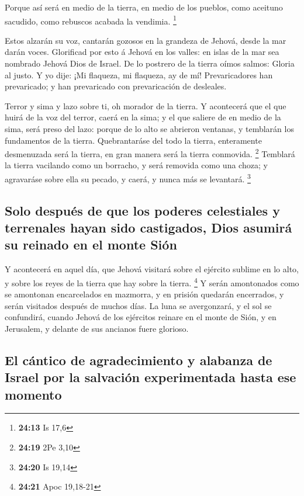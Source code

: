  Porque así será en medio de la tierra, en medio de los
pueblos, como aceituno sacudido, como rebuscos acabada la vendimia.
\footnote{\textbf{24:13} Is 17,6}

 Estos alzarán su voz, cantarán gozosos en la grandeza de
Jehová, desde la mar darán voces.  Glorificad por esto á
Jehová en los valles: en islas de la mar sea nombrado Jehová Dios de
Israel.  De lo postrero de la tierra oímos salmos: Gloria
al justo. Y yo dije: ¡Mi flaqueza, mi flaqueza, ay de mí! Prevaricadores
han prevaricado; y han prevaricado con prevaricación de desleales.

 Terror y sima y lazo sobre ti, oh morador de la tierra.
 Y acontecerá que el que huirá de la voz del terror,
caerá en la sima; y el que saliere de en medio de la sima, será preso
del lazo: porque de lo alto se abrieron ventanas, y temblarán los
fundamentos de la tierra.  Quebrantaráse del todo la
tierra, enteramente desmenuzada será la tierra, en gran manera será la
tierra conmovida. \footnote{\textbf{24:19} 2Pe 3,10} 
Temblará la tierra vacilando como un borracho, y será removida como una
choza; y agravaráse sobre ella su pecado, y caerá, y nunca más se
levantará. \footnote{\textbf{24:20} Is 19,14}

\hypertarget{solo-despuuxe9s-de-que-los-poderes-celestiales-y-terrenales-hayan-sido-castigados-dios-asumiruxe1-su-reinado-en-el-monte-siuxf3n}{%
\subsection{Solo después de que los poderes celestiales y terrenales
hayan sido castigados, Dios asumirá su reinado en el monte
Sión}\label{solo-despuuxe9s-de-que-los-poderes-celestiales-y-terrenales-hayan-sido-castigados-dios-asumiruxe1-su-reinado-en-el-monte-siuxf3n}}

 Y acontecerá en aquel día, que Jehová visitará sobre el
ejército sublime en lo alto, y sobre los reyes de la tierra que hay
sobre la tierra. \footnote{\textbf{24:21} Apoc 19,18-21} 
Y serán amontonados como se amontonan encarcelados en mazmorra, y en
prisión quedarán encerrados, y serán visitados después de muchos días.
 La luna se avergonzará, y el sol se confundirá, cuando
Jehová de los ejércitos reinare en el monte de Sión, y en Jerusalem, y
delante de sus ancianos fuere glorioso.

\hypertarget{el-cuxe1ntico-de-agradecimiento-y-alabanza-de-israel-por-la-salvaciuxf3n-experimentada-hasta-ese-momento}{%
\subsection{El cántico de agradecimiento y alabanza de Israel por la
salvación experimentada hasta ese
momento}\label{el-cuxe1ntico-de-agradecimiento-y-alabanza-de-israel-por-la-salvaciuxf3n-experimentada-hasta-ese-momento}}

